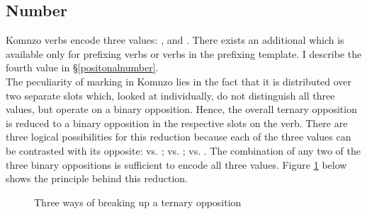 \subsection{Number} \label{numbersubsec}

Komnzo verbs encode three  values: ,  and . There exists an additional  which is available only for prefixing verbs or verbs in the prefixing template. I describe the fourth  value in \S{}\ref{positonalnumber}.\\

The peculiarity of  marking in Komnzo lies in the fact that it is distributed over two separate slots which, looked at individually, do not distinguish all three values, but operate on a binary opposition. Hence, the overall ternary  opposition is reduced to a binary opposition in the respective slots on the verb. There are three logical possibilities for this reduction because each of the three  values can be contrasted with its opposite:  vs. ;  vs. ;  vs. . The combination of any two of the three binary oppositions is sufficient to encode all three  values. Figure \ref{ternbinary} below shows the principle behind this reduction.

\begin{figure}

\caption{Three ways of breaking up a ternary opposition}\label{ternbinary}
\end{figure}%

